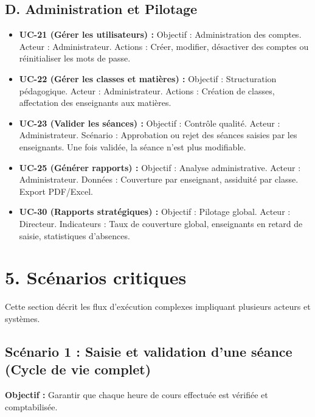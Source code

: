 \documentclass[a4paper, 11pt]{article}
\begin{document}
\subsection*{D. Administration et Pilotage}
\begin{itemize}
    \item \textbf{UC-21 (Gérer les utilisateurs) :} 
    Objectif : Administration des comptes. Acteur : Administrateur.
    Actions : Créer, modifier, désactiver des comptes ou réinitialiser les mots de passe.

    \item \textbf{UC-22 (Gérer les classes et matières) :} 
    Objectif : Structuration pédagogique. Acteur : Administrateur.
    Actions : Création de classes, affectation des enseignants aux matières.

    \item \textbf{UC-23 (Valider les séances) :} 
    Objectif : Contrôle qualité. Acteur : Administrateur.
    Scénario : Approbation ou rejet des séances saisies par les enseignants. Une fois validée, la séance n'est plus modifiable.

    \item \textbf{UC-25 (Générer rapports) :} 
    Objectif : Analyse administrative. Acteur : Administrateur.
    Données : Couverture par enseignant, assiduité par classe. Export PDF/Excel.

    \item \textbf{UC-30 (Rapports stratégiques) :} 
    Objectif : Pilotage global. Acteur : Directeur.
    Indicateurs : Taux de couverture global, enseignants en retard de saisie, statistiques d'absences.
\end{itemize}
\section*{5. Scénarios critiques}

Cette section décrit les flux d'exécution complexes impliquant plusieurs acteurs et systèmes.

\subsection*{Scénario 1 : Saisie et validation d'une séance (Cycle de vie complet)}
\textbf{Objectif :} Garantir que chaque heure de cours effectuée est vérifiée et comptabilisée.
\end{document}

